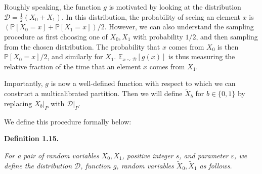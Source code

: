 Roughly speaking, the function $g$ is motivated by looking at the distribution $\mathcal{D}=\frac{1}{2}(X_{0}+X_{1})$. In this distribution, the probability of seeing an element $x$ is $(\mathbb{P}[X_{0}=x]+\mathbb{P}[X_{1}=x])/2$. However, we can also understand the sampling procedure as first choosing one of $X_{0},X_{1}$ with probability $1/2$, and then sampling from the chosen distribution. The probability that $x$ comes from $X_{0}$ is then $\mathbb{P}[X_{0}=x]/2$, and similarly for $X_{1}$. $\mathbb{E}_{x\sim\mathcal{D}}[g(x)]$ is thus measuring the relative fraction of the time that an element $x$ comes from $X_{1}$.\par




Importantly, $g$ is now a well-defined function with respect to which we can construct a multicalibrated partition. Then we will define $\widetilde{X}_{b}$ for $b\in\{0,1\}$ by replacing $X_{b}|_{P}$ with $\mathcal{D}|_{P}$.\par




We define this procedure formally below:\par





\par\medskip\noindent\textbf{
\textbf{Definition 1.15}\textbf{.}
}\par



\emph{For a pair of random variables $X_{0},X_{1}$, positive integer $s$, and parameter $\varepsilon$,
we define the distribution $\mathcal{D}$, function $g$, random variables $\widetilde{X}_{0},\widetilde{X}_{1}$ as follows.}\par


